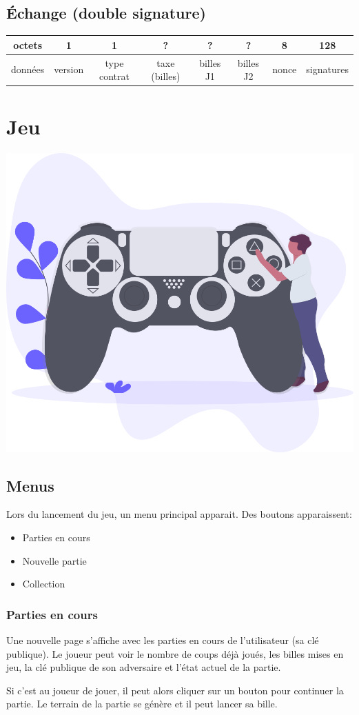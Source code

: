 \documentclass{article}
\begin{document}
\subsection{Échange (double signature)}
\hspace*{-1cm}%
\begin{tabular}{ |c|c|c|c|c|c|c|c|} 
 \hline
 octets & 1 & 1 & ? & ? & ? & 8 & 128\\ 
 \hline
    données & version & type contrat & taxe (billes) & billes J1 & billes J2 & nonce & signatures\\ 
 \hline
\end{tabular}

\section{Jeu}
\includegraphics[width=0.3\linewidth]{assets/gaming.png}\\
\subsection{Menus}

Lors du lancement du jeu, un menu principal apparait. Des boutons apparaissent:
\begin{itemize}
    \item Parties en cours
    \item Nouvelle partie
    \item Collection
\end{itemize}

\subsubsection{Parties en cours}
Une nouvelle page s'affiche avec les parties en cours de l'utilisateur (sa clé publique). Le joueur peut voir le nombre de coups déjà joués, les billes mises en jeu, la clé publique de son adversaire et l'état actuel de la partie.

Si c'est au joueur de jouer, il peut alors cliquer sur un bouton pour continuer la partie. Le terrain de la partie se génère et il peut lancer sa bille.
\end{document}
